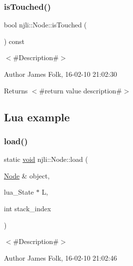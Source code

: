 \subsubsection{\texorpdfstring{is\+Touched()}{isTouched()}}
{\footnotesize\ttfamily bool njli\+::\+Node\+::is\+Touched (\begin{DoxyParamCaption}{ }\end{DoxyParamCaption}) const}



$<$\#\+Description\#$>$ 

\begin{DoxyAuthor}{Author}
James Folk, 16-\/02-\/10 21\+:02\+:30
\end{DoxyAuthor}
\begin{DoxyReturn}{Returns}
$<$\#return value description\#$>$
\end{DoxyReturn}
\hypertarget{classnjli_1_1_steering_behavior_wander_ex1}{}\subsection{Lua example}\label{classnjli_1_1_steering_behavior_wander_ex1}

\begin{DoxyCodeInclude}
\end{DoxyCodeInclude}
\mbox{\label{classnjli_1_1_node_a5426eabdd117e6a4884baa963c5f402a}} 
\subsubsection{\texorpdfstring{load()}{load()}}
{\footnotesize\ttfamily static \mbox{\hyperlink{_thread_8h_af1e856da2e658414cb2456cb6f7ebc66}{void}} njli\+::\+Node\+::load (\begin{DoxyParamCaption}\item[{\mbox{\hyperlink{classnjli_1_1_node}{Node}} \&}]{object,  }\item[{lua\+\_\+\+State $\ast$}]{L,  }\item[{int}]{stack\+\_\+index }\end{DoxyParamCaption})\hspace{0.3cm}{\ttfamily [static]}}



$<$\#\+Description\#$>$ 

\begin{DoxyAuthor}{Author}
James Folk, 16-\/02-\/10 21\+:02\+:46
\end{DoxyAuthor}


